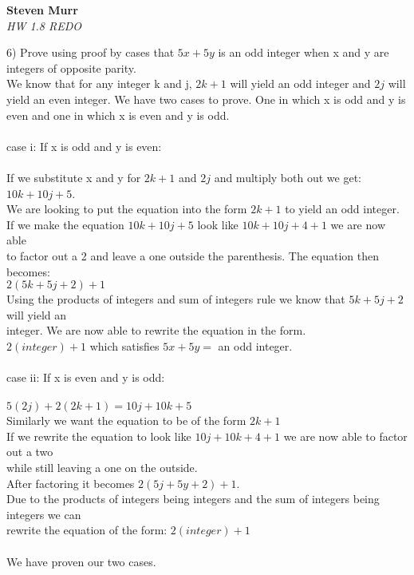 \documentclass{article}
\begin{document}
\setcounter{totalnumber}{5}
   \begin{flushright}
      \Large\textbf{Steven Murr}\\
      \large\textit{HW 1.8 REDO}
   \end{flushright}
\begin{flushleft}
\makeatletter%
\setlength{\@fptop}{5pt}
\makeatother

\setlength\parindent{0pt}6) Prove using proof by cases that $5x + 5y$ is an odd integer when x and y are integers of opposite parity. \\
\setlength\parindent{24pt}We know that for any integer k and j, $2k + 1$ will yield an odd integer and $2j$ will yield an even integer.  We have two cases to prove.  One in which x is odd and y is even and one in which x is even and y is odd.  \\
~\\
\setlength\parindent{48pt} case i: If x is odd and y is even:\\
~\\
\setlength\parindent{48pt} If we substitute x and y for $2k + 1$ and $2j$ and multiply both out we get:  $10k + 10j + 5$.  \\We are looking to put the equation into the form $2k + 1$ to yield an odd integer.  \\If we make the equation $10k + 10j + 5$ look like $10k + 10j + 4 + 1$ we are now able\\ to factor out a 2 and leave a one outside the parenthesis.  The equation then becomes:  \\
\setlength\parindent{48pt} $2(5k + 5j + 2)+ 1$ \\
\setlength\parindent{48pt} Using the products of integers and sum of integers rule we know that $5k + 5j + 2$ will yield an \\integer.  We are now able to rewrite the equation in the form. \\
\setlength\parindent{48pt} $2(integer) + 1$ which satisfies $5x + 5y = $ an odd integer. \\
~\\
\setlength\parindent{48pt} case ii: If x is even and y is odd: \\
~\\
\setlength\parindent{48pt} $5(2j) + 2(2k+1) = 10j + 10 k + 5$ \\
\setlength\parindent{48pt} Similarly we want the equation to be of the form $2k+1$ \\
\setlength\parindent{48pt} If we rewrite the equation to look like $10j + 10k + 4 + 1$ we are now able to factor out a two \\while still leaving a one on the outside. \\
\setlength\parindent{48pt} After factoring it becomes $2(5j + 5y + 2) + 1$.  \\Due to the products of integers being integers and the sum of integers being integers we can \\rewrite the equation of the form:
\setlength\parindent{48pt} $2(integer) + 1$\\
~\\
\setlength\parindent{48pt} We have proven our two cases.


\end{flushleft}
\end{document}
